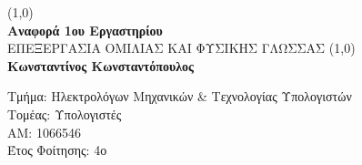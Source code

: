 \documentclass[12pt,a4paper]{report}
\begin{document}
       \begin{titlepage}
              \begin{center}
              \vspace*{1cm}

              \line(1,0){\textwidth}\\
              \textbf{Αναφορά 1ου Εργαστηρίου}\\
              \vspace{0.5cm}
              ΕΠΕΞΕΡΓΑΣΙΑ ΟΜΙΛΙΑΣ ΚΑΙ ΦΥΣΙΚΗΣ ΓΛΩΣΣΑΣ
              \vspace{1.5cm}
              \line(1,0){\textwidth}\\
              \textbf{Κωνσταντίνος Κωνσταντόπουλος}


              \vspace{0.8cm}


              Τμήμα: Ηλεκτρολόγων Μηχανικών \& Τεχνολογίας Υπολογιστών\\
              Τομέας: Υπολογιστές\\
              ΑΜ: 1066546\\
              Έτος Φοίτησης: 4ο
              \end{center}
       \end{titlepage}
\end{document}
